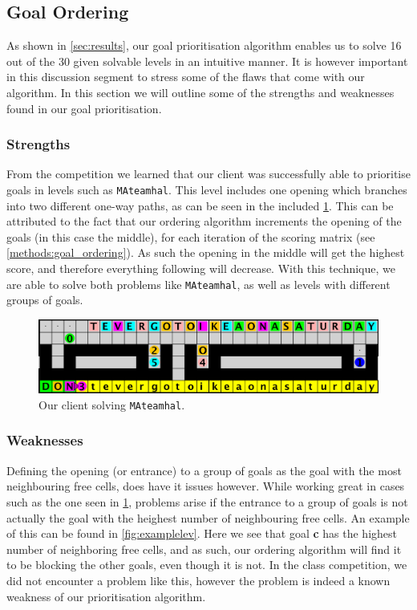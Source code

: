 \subsection{Goal Ordering}
\label{subsec:disc_goal_ordering}

As shown in \cref{sec:results}, our goal prioritisation algorithm enables us to solve 16 out of the 30 given solvable levels in an intuitive manner.
It is however important in this discussion segment to stress some of the flaws that come with our algorithm.
In this section we will outline some of the strengths and weaknesses found in our goal prioritisation.

\subsubsection{Strengths} From the competition we learned that our client was successfully able to prioritise goals in levels such as \texttt{MAteamhal}.
This level includes one opening which branches into two different one-way paths, as can be seen in the included \cref{fig:mateamhal}.
This can be attributed to the fact that our ordering algorithm increments the opening of the goals (in this case the middle), for each iteration of the scoring matrix (see \cref{methods:goal_ordering}).
As such the opening in the middle will get the highest score, and therefore everything following will decrease.
With this technique, we are able to solve both problems like \texttt{MAteamhal}, as well as levels with different groups of goals.

\begin{figure}[h!]
  \centering
  \includegraphics[width=.95\columnwidth]{graphics/mateahhal.png}
  \caption{\label{fig:mateamhal}Our client solving \texttt{MAteamhal}.}
\end{figure}

\subsubsection{Weaknesses} Defining the opening (or entrance) to a group of goals as the goal with the most neighbouring free cells, does have it issues however.
While working great in cases such as the one seen in \cref{fig:mateamhal}, problems arise if the entrance to a group of goals is not actually the goal with the heighest number of neighbouring free cells.
An example of this can be found in \cref{fig:examplelev}.
Here we see that goal \textbf{c} has the highest number of neighboring free cells, and as such, our ordering algorithm will find it to be blocking the other goals, even though it is not.
In the class competition, we did not encounter a problem like this, however the problem is indeed a known weakness of our prioritisation algorithm.

